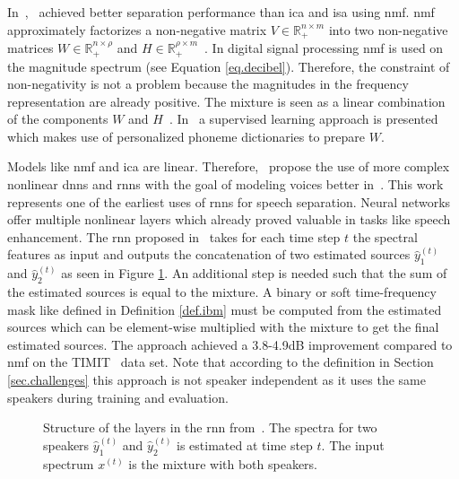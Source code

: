 In~\citeyear{Virtanen2007},~\textcite[p.~1071]{Virtanen2007} achieved better separation performance than \gls{ica} and \gls{isa} using \gls{nmf}. \gls{nmf} approximately factorizes a non-negative matrix $V \in \mathbb{R}_+^{n \times m}$ into two non-negative matrices $W \in \mathbb{R}_+^{n \times \rho}$ and $H \in \mathbb{R}_+^{\rho \times m}$~\cite{Schuller2010,Lee1999}. In digital signal processing \gls{nmf} is used on the magnitude spectrum (see Equation \ref{eq.decibel}). Therefore, the constraint of non-negativity is not a problem because the magnitudes in the frequency representation are already positive. The mixture is seen as a linear combination of the components $W$ and $H$~\cite{Schuller2010}.
In~\cite{Schmidt2006} a supervised learning approach is presented which makes use of personalized phoneme dictionaries to prepare $W$.

Models like \gls{nmf} and \gls{ica} are linear. Therefore,~\textcite{Huang2014} propose the use of more complex nonlinear \glspl{dnn} and \glspl{rnn} with the goal of modeling voices better in~\citeyear{Huang2014}. This work represents one of the earliest uses of \glspl{rnn} for speech separation.
Neural networks offer multiple nonlinear layers which already proved valuable in tasks like speech enhancement. %
The \gls{rnn} proposed in~\cite{Huang2014} takes for each time step $t$ the spectral features as input and outputs the concatenation of two estimated sources $\hat{y}_1^{(t)}$ and $\hat{y}_2^{(t)}$ as seen in Figure \ref{fig.huang.structure}. An additional step is needed such that the sum of the estimated sources is equal to the mixture.
A binary or soft time-frequency mask like defined in Definition \ref{def.ibm} must be computed from the estimated sources which can be element-wise multiplied with the mixture to get the final estimated sources.
The approach achieved a 3.8-4.9\si{\dB} improvement compared to \gls{nmf} on the TIMIT~\cite{Garofolo1993} data set. %
Note that according to the definition in Section \ref{sec.challenges} this approach is not speaker independent as it uses the same speakers during training and evaluation.
\begin{figure}
	\centering
	
	\caption{Structure of the layers in the \gls{rnn} from~\cite{Huang2014}. The spectra for two speakers $\hat{y}_1^{(t)}$ and $\hat{y}_2^{(t)}$ is estimated at time step $t$. The input spectrum $x^{(t)}$ is the mixture with both speakers.}
	\label{fig.huang.structure}
\end{figure}

